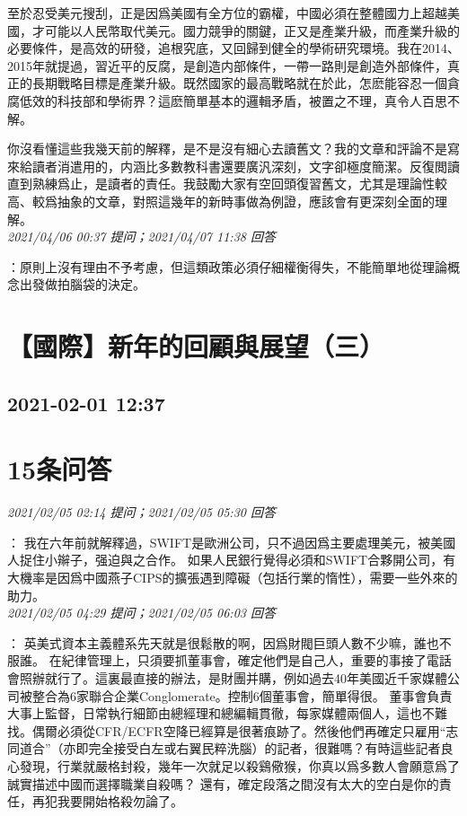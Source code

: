 \documentclass[twocolumn]{ctexart}
\begin{document}
至於忍受美元搜刮，正是因爲美國有全方位的霸權，中國必須在整體國力上超越美國，才可能以人民幣取代美元。國力競爭的關鍵，正又是產業升級，而產業升級的必要條件，是高效的研發，追根究底，又回歸到健全的學術研究環境。我在2014、2015年就提過，習近平的反腐，是創造内部條件，一帶一路則是創造外部條件，真正的長期戰略目標是產業升級。既然國家的最高戰略就在於此，怎麽能容忍一個貪腐低效的科技部和學術界？這麽簡單基本的邏輯矛盾，被置之不理，真令人百思不解。

你沒看懂這些我幾天前的解釋，是不是沒有細心去讀舊文？我的文章和評論不是寫來給讀者消遣用的，内涵比多數教科書還要廣汎深刻，文字卻極度簡潔。反復閲讀直到熟練爲止，是讀者的責任。我鼓勵大家有空回頭復習舊文，尤其是理論性較高、較爲抽象的文章，對照這幾年的新時事做為例證，應該會有更深刻全面的理解。
\\

\textit{\hfill\noindent\small 2021/04/06 00:37 提问；2021/04/07 11:38 回答}

：原則上沒有理由不予考慮，但這類政策必須仔細權衡得失，不能簡單地從理論概念出發做拍腦袋的決定。
\\


\section{【國際】新年的回顧與展望（三）}
\subsection{2021-02-01 12:37}


\section{15条问答}

\textit{\hfill\noindent\small 2021/02/05 02:14 提问；2021/02/05 05:30 回答}

：
我在六年前就解釋過，SWIFT是歐洲公司，只不過因爲主要處理美元，被美國人捉住小辮子，强迫與之合作。
如果人民銀行覺得必須和SWIFT合夥開公司，有大機率是因爲中國燕子CIPS的擴張遇到障礙（包括行業的惰性），需要一些外來的助力。
\\

\textit{\hfill\noindent\small 2021/02/05 04:29 提问；2021/02/05 06:03 回答}

：
英美式資本主義體系先天就是很鬆散的啊，因爲財閥巨頭人數不少嘛，誰也不服誰。
在紀律管理上，只須要抓董事會，確定他們是自己人，重要的事接了電話會照辦就行了。這裏最直接的辦法，是財團并購，例如過去40年美國近千家媒體公司被整合為6家聯合企業Conglomerate。控制6個董事會，簡單得很。
董事會負責大事上監督，日常執行細節由總經理和總編輯貫徹，每家媒體兩個人，這也不難找。偶爾必須從CFR/ECFR空降已經算是很著痕跡了。然後他們再確定只雇用“志同道合”（亦即完全接受白左或右翼民粹洗腦）的記者，很難嗎？有時這些記者良心發現，行業就嚴格封殺，幾年一次就足以殺鷄儆猴，你真以爲多數人會願意爲了誠實描述中國而選擇職業自殺嗎？
還有，確定段落之間沒有太大的空白是你的責任，再犯我要開始格殺勿論了。
\\
\end{document}

